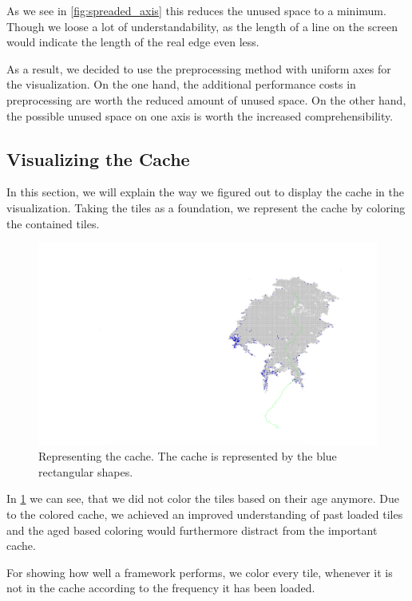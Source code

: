 \documentclass
[
    paper = a4,
    pagesize,
    12 pt,
    oneside,                       %
    open = right,
    DIV = calc,
    BCOR = 0 mm,                   %
    bibtotoc
]
{scrbook}
\begin{document}
As we see in \cref{fig:spreaded_axis} this reduces the unused space to a minimum.
Though we loose a lot of understandability, as the length of a line on the screen would indicate the length of the real edge even less.

As a result, we decided to use the preprocessing method with uniform axes for the visualization.
On the one hand, the additional performance costs in preprocessing are worth the reduced amount of unused space.
On the other hand, the possible unused space on one axis is worth the increased comprehensibility.


\subsection{Visualizing the Cache}

In this section, we will explain the way we figured out to display the cache in the visualization.
Taking the tiles as a foundation, we represent the cache by coloring the contained tiles.

\begin{figure}[H]
    \includegraphics[width=\textwidth]{Images/vis-basic-cache.png}
\caption[]{Representing the cache. The cache is represented by the blue rectangular shapes.}
\label{fig:cache_coloring}
\end{figure}

In \cref{fig:cache_coloring} we can see, that we did not color the tiles based on their age anymore.
Due to the colored cache, we achieved an improved understanding of past loaded tiles and the aged based coloring would furthermore distract from the important cache.

For showing how well a framework performs, we color every tile, whenever it is not in the cache according to the frequency it has been loaded.
\end{document}
